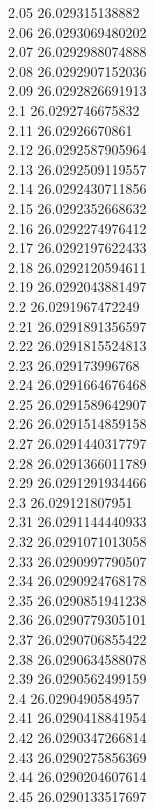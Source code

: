 {2.05	26.029315138882\\
2.06	26.0293069480202\\
2.07	26.0292988074888\\
2.08	26.0292907152036\\
2.09	26.0292826691913\\
2.1	26.0292746675832\\
2.11	26.02926670861\\
2.12	26.0292587905964\\
2.13	26.0292509119557\\
2.14	26.0292430711856\\
2.15	26.0292352668632\\
2.16	26.0292274976412\\
2.17	26.0292197622433\\
2.18	26.0292120594611\\
2.19	26.0292043881497\\
2.2	26.0291967472249\\
2.21	26.0291891356597\\
2.22	26.0291815524813\\
2.23	26.029173996768\\
2.24	26.0291664676468\\
2.25	26.0291589642907\\
2.26	26.0291514859158\\
2.27	26.0291440317797\\
2.28	26.0291366011789\\
2.29	26.0291291934466\\
2.3	26.029121807951\\
2.31	26.0291144440933\\
2.32	26.0291071013058\\
2.33	26.0290997790507\\
2.34	26.0290924768178\\
2.35	26.0290851941238\\
2.36	26.0290779305101\\
2.37	26.0290706855422\\
2.38	26.0290634588078\\
2.39	26.0290562499159\\
2.4	26.0290490584957\\
2.41	26.0290418841954\\
2.42	26.0290347266814\\
2.43	26.0290275856369\\
2.44	26.0290204607614\\
2.45	26.0290133517697\\
}
